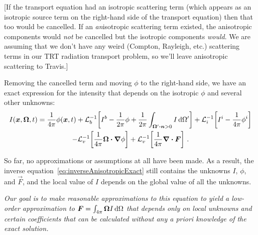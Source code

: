 [If the transport equation had an isotropic
scattering term (which appears as an isotropic source term on the right-hand
side of the transport equation) then that too would be cancelled. If an
\emph{an}isotropic scattering term existed, the anisotropic components would
\emph{not} be cancelled but the isotropic components \emph{would}. We are
assuming that we don't have any weird (Compton, Rayleigh, etc.) scattering
terms in our TRT radiation transport problem, so we'll leave anisotropic
scattering to Travis.]

Removing the cancelled term and moving $\phi$ to the right-hand side, we have
an exact expression for the intensity that depends on the isotropic $\phi$
and several other unknowns:
\begin{multline}\label{eq:inverseAnisotropicExact}
  I(\bm{x}, \bm{\Omega}, t) = \frac1{4\pi} \phi(\bm{x}, t) 
  + \mathcal{L}_{b}^{-1}\!\left[I^b - \frac{1}{2\pi} \phi
  + \frac{1}{2\pi} \int_{\bm{\Omega}' \bm{\cdot} \bm{n} > 0}
  I\mathop{}\!\mathrm{d}\Omega'\right]
 + \mathcal{L}_{i}^{-1}\!\left[I^i - \frac1{4\pi} \phi^i \right]
 \\
 - \mathcal{L}_{v}^{-1}\!\left[ \frac1{4\pi}\bm{\Omega}\bm{\cdot} \bm{\nabla} \phi \right]
 + \mathcal{L}_{v}^{-1}\!\left[ \frac1{4\pi}\bm{\nabla} \bm{\cdot} \bm{F} \right]\,.
\end{multline}

So far, no approximations or assumptions at all have been made. As a
result, the inverse equation~\ref{eq:inverseAnisotropicExact} still contains
the unknowns $I$, $\phi$, and $\vec{F}$, and the local value of
$I$ depends on the global value of all the unknowns.

\emph{
Our goal is to make reasonable approximations to this equation to yield a
low-order approximation to $\bm{F}=\int_{4\pi}\bm{\Omega} I \mathop{}\!\mathrm{d} \Omega$ that
depends only on local unknowns and certain coefficients that can be calculated
without any \emph{a priori} knowledge of the exact solution.
}

